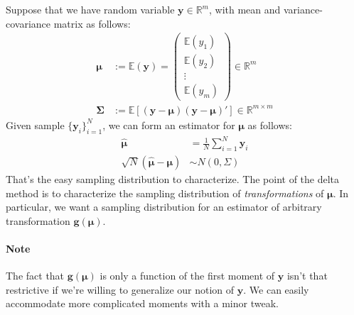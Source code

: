 \documentclass[12pt]{article}
\theoremstyle{plain}
\theoremstyle{definition}
\theoremstyle{remark}
\begin{document}
Suppose that we have random variable $\boldsymbol{y}\in \mathbb{R}^m$,
with mean and variance-covariance matrix as follows:
\begin{align*}
  \boldsymbol{\mu} &:= \mathbb{E}(\boldsymbol{y}) =
  \begin{pmatrix}
    \mathbb{E}(y_1)\\\mathbb{E}(y_2)\\\vdots\\\mathbb{E}(y_m)
  \end{pmatrix}
  \in \mathbb{R}^m
  \\
  \boldsymbol{\Sigma}
  &:=
  \mathbb{E}\left[
    (\boldsymbol{y}-\boldsymbol{\mu})
    (\boldsymbol{y}-\boldsymbol{\mu})'
  \right]
  \in \mathbb{R}^{m\times m}
\end{align*}
Given sample $\{\boldsymbol{y}_i\}_{i=1}^N$, we can form an estimator
for $\boldsymbol{\mu}$ as follows:
\begin{align*}
  \boldsymbol{\hat{\mu}}
  &=
  \frac{1}{N}
  \sum^N_{i=1}
  \boldsymbol{y}_i\\
  \sqrt{N}(\boldsymbol{\hat{\mu}} - \boldsymbol{\mu})
  &\sim N(0,\Sigma)
\end{align*}
That's the easy sampling distribution to characterize. The point of the
delta method is to characterize the sampling distribution of
\emph{transformations} of $\boldsymbol{\mu}$. In particular, we want a
sampling distribution for an estimator of arbitrary transformation
$\boldsymbol{g}(\boldsymbol{\mu})$.

\paragraph{Note}
The fact that $\boldsymbol{g}(\boldsymbol{\mu})$ is only a function of
the first moment of $\boldsymbol{y}$ isn't that restrictive if we're
willing to generalize our notion of $\boldsymbol{y}$. We can easily
accommodate more complicated moments with a minor tweak.
\end{document}

